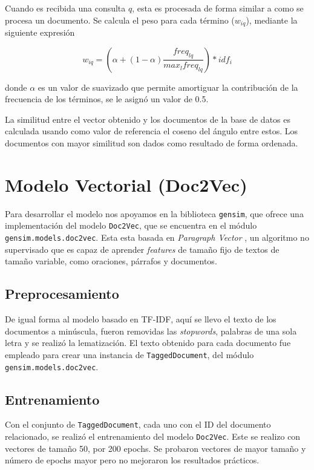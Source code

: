 \documentclass[12pt]{llncs}
\begin{document}
Cuando es recibida una consulta $q$, esta es procesada de forma similar a como se procesa un documento. Se calcula el peso para cada término ($w_{iq}$), mediante la siguiente expresión

$$w_{iq} = (\alpha + (1 - \alpha) \frac{freq_{lq}}{max_l freq_{lq}}) * idf_i$$

donde $\alpha$ es un valor de suavizado que permite amortiguar la contribución de la frecuencia de los términos, se le asignó un valor de 0.5.

La similitud entre el vector obtenido y los documentos de la base de datos es calculada usando como valor de referencia el coseno del ángulo entre estos. Los documentos con mayor similitud son dados como resultado de forma ordenada.


\section{Modelo Vectorial (Doc2Vec)}

Para desarrollar el modelo nos apoyamos en la biblioteca \verb+gensim+, que ofrece una implementación del modelo \verb+Doc2Vec+, que se encuentra en el módulo \verb+gensim.models.doc2vec+. Esta esta basada en \textit{Paragraph Vector} \cite{le2014distributed}, un algoritmo no supervisado que es capaz de aprender \textit{features} de tamaño fijo de textos de tamaño variable, como oraciones, párrafos y documentos. 

\subsection{Preprocesamiento}

De igual forma al modelo basado en TF-IDF, aquí se llevo el texto de los documentos a minúscula, fueron removidas las \textit{stopwords}, palabras de una sola letra y se realizó la lematización. El texto obtenido para cada documento fue empleado para crear una instancia de \verb+TaggedDocument+, del módulo \verb+gensim.models.doc2vec+.

\subsection{Entrenamiento}

Con el conjunto de \verb+TaggedDocument+, cada uno con el ID del documento relacionado, se realizó el entrenamiento del modelo \verb+Doc2Vec+. Este se realizo con vectores de tamaño 50, por 200 epochs. Se probaron vectores de mayor tamaño y número de epochs mayor pero no mejoraron los resultados prácticos.
\end{document}
